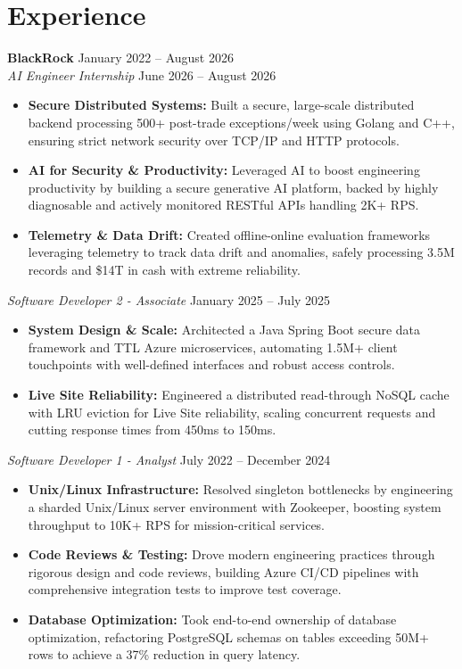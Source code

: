 \documentclass[11pt,a4paper]{article}
\begin{document}
\section{Experience}
\noindent
\textbf{BlackRock} \hfill January 2022 -- August 2026 \\
\textit{AI Engineer Internship} \hfill June 2026 -- August 2026
\begin{itemize}[leftmargin=*,noitemsep,topsep=0pt]
    \item \textbf{Secure Distributed Systems:} Built a secure, large-scale distributed backend processing 500+ post-trade exceptions/week using Golang and C++, ensuring strict network security over TCP/IP and HTTP protocols.
    \item \textbf{AI for Security \& Productivity:} Leveraged AI to boost engineering productivity by building a secure generative AI platform, backed by highly diagnosable and actively monitored RESTful APIs handling 2K+ RPS.
    \item \textbf{Telemetry \& Data Drift:} Created offline-online evaluation frameworks leveraging telemetry to track data drift and anomalies, safely processing 3.5M records and \$14T in cash with extreme reliability.
\end{itemize}

\vspace{3pt}
\noindent
\textit{Software Developer 2 - Associate} \hfill January 2025 -- July 2025
\begin{itemize}[leftmargin=*,noitemsep,topsep=0pt]
    \item \textbf{System Design \& Scale:} Architected a Java Spring Boot secure data framework and TTL Azure microservices, automating 1.5M+ client touchpoints with well-defined interfaces and robust access controls.
    \item \textbf{Live Site Reliability:} Engineered a distributed read-through NoSQL cache with LRU eviction for Live Site reliability, scaling concurrent requests and cutting response times from 450ms to 150ms.
\end{itemize}

\vspace{3pt}
\noindent
\textit{Software Developer 1 - Analyst} \hfill July 2022 -- December 2024
\begin{itemize}[leftmargin=*,noitemsep,topsep=0pt]
    \item \textbf{Unix/Linux Infrastructure:} Resolved singleton bottlenecks by engineering a sharded Unix/Linux server environment with Zookeeper, boosting system throughput to 10K+ RPS for mission-critical services.
    \item \textbf{Code Reviews \& Testing:} Drove modern engineering practices through rigorous design and code reviews, building Azure CI/CD pipelines with comprehensive integration tests to improve test coverage.
    \item \textbf{Database Optimization:} Took end-to-end ownership of database optimization, refactoring PostgreSQL schemas on tables exceeding 50M+ rows to achieve a 37\% reduction in query latency.
\end{itemize}
\end{document}
